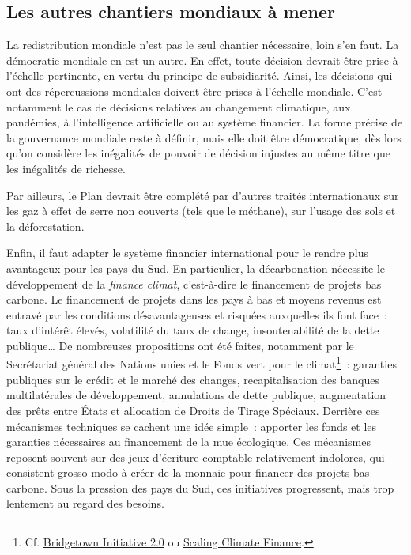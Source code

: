 \documentclass[a5paper,french,openany]{memoir}
\begin{document}
\subsection{Les autres chantiers mondiaux à mener}
La redistribution mondiale n'est pas le seul chantier nécessaire, loin s'en faut. La démocratie mondiale en est un autre. %
En effet, toute décision devrait être prise à l'échelle pertinente, en vertu du principe de subsidiarité. Ainsi, les décisions qui ont des répercussions mondiales doivent être prises à l'échelle mondiale. %
C'est notamment le cas de décisions relatives au changement climatique, aux pandémies, à l'intelligence artificielle ou au système financier. %
La forme précise de la gouvernance mondiale reste à définir, mais elle doit être démocratique, dès lors qu'on considère les inégalités de pouvoir de décision injustes au même titre que les inégalités de richesse. %

Par ailleurs, le Plan devrait être complété par d'autres traités internationaux sur les gaz à effet de serre non couverts (tels que le méthane), sur l'usage des sols et la déforestation. 

Enfin, il faut adapter le système financier international pour le rendre plus avantageux pour les pays du Sud. En particulier, la décarbonation nécessite le développement de la \textit{finance climat}, c'est-à-dire le financement de projets bas carbone. Le financement de projets dans les pays à bas et moyens revenus est entravé par les conditions désavantageuses et risquées auxquelles ils font face~: taux d'intérêt élevés, volatilité du taux de change, insoutenabilité de la dette publique\dots{} De nombreuses propositions ont été faites, notamment par le Secrétariat général des Nations unies et le Fonds vert pour le climat\footnote{Cf. \href{https://www.un.org/sustainabledevelopment/blog/2023/04/press-release-with-clock-ticking-for-the-sdgs-un-chief-and-barbados-prime-minister-call-for-urgent-action-to-transform-broken-global-financial-system/}{Bridgetown Initiative 2.0} ou \href{https://www.greenclimate.fund/sites/default/files/document/scaling-climate-finance-context-covid-19-full-report\_0.pdf}{Scaling Climate Finance}.}~: garanties publiques sur le crédit et le marché des changes, recapitalisation des banques multilatérales de développement, annulations de dette publique, augmentation des prêts entre États et allocation de Droits de Tirage Spéciaux. Derrière ces mécanismes techniques se cachent une idée simple~: apporter les fonds et les garanties nécessaires au financement de la mue écologique. Ces mécanismes reposent souvent sur des jeux d'écriture comptable relativement indolores, qui consistent grosso modo à créer de la monnaie pour financer des projets bas carbone. Sous la pression des pays du Sud, ces initiatives progressent, mais trop lentement au regard des besoins.
\end{document}
